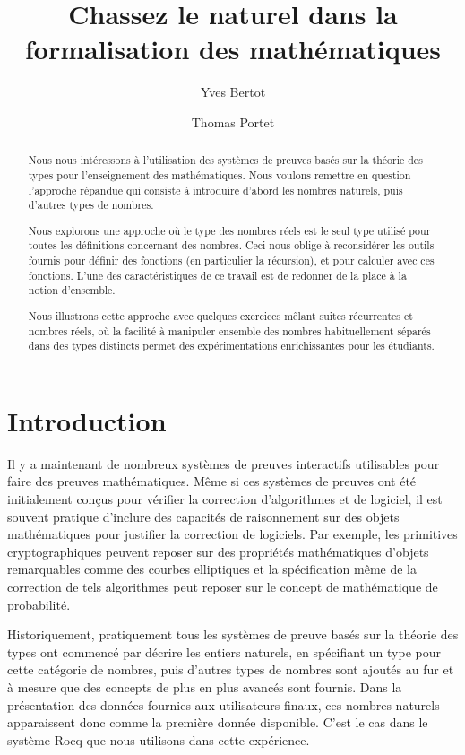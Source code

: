 \documentclass{modjflart}
\title{Chassez le naturel dans la formalisation des mathématiques}
\author[1]{Yves Bertot}
\author[1]{Thomas Portet}
\affil[1]{Centre Inria de l'Université Côte d'Azur, France}
\begin{document}
\maketitle

\begin{abstract}
  Nous nous intéressons à l'utilisation des systèmes de preuves basés sur la
  théorie des types pour l'enseignement des mathématiques.  Nous voulons
  remettre en question l'approche répandue qui consiste à introduire
  d'abord les nombres naturels, puis d'autres types de nombres.

  Nous explorons une approche où le type des nombres réels est le seul type
  utilisé pour toutes les définitions concernant des nombres.  Ceci nous oblige
  à reconsidérer les outils fournis pour définir des fonctions (en particulier
  la récursion), et pour calculer avec ces fonctions.
  L'une des caractéristiques de ce travail est de redonner de la place à
  la notion d'ensemble.

  Nous illustrons cette approche avec quelques exercices mêlant suites
  récurrentes et nombres réels, où la facilité à manipuler ensemble des nombres
  habituellement séparés dans des types distincts permet des expérimentations
  enrichissantes pour les étudiants.
\end{abstract}

\section{Introduction}

Il y a maintenant de nombreux systèmes de preuves interactifs
utilisables pour faire des preuves mathématiques.  Même si ces
systèmes de preuves ont été initialement conçus pour vérifier la
correction d'algorithmes et de logiciel, il est souvent pratique
d'inclure des capacités de raisonnement sur des objets mathématiques
pour justifier la correction de logiciels.  Par exemple, les
primitives cryptographiques peuvent reposer sur des propriétés
mathématiques d'objets remarquables comme des courbes elliptiques et
la spécification même de la correction de tels algorithmes peut
reposer sur le concept de mathématique de probabilité.

Historiquement, pratiquement tous les systèmes de preuve basés sur la
théorie des types ont commencé
par décrire les entiers naturels, en spécifiant un type pour cette
catégorie de nombres, puis d'autres types de nombres sont ajoutés au
fur et à mesure que des concepts de plus en plus avancés sont fournis.
Dans la présentation des données fournies aux utilisateurs finaux, ces
nombres naturels apparaissent donc comme la première donnée
disponible.  C'est le cas dans le système Rocq
\cite{the_coq_development_team_2024_11551307} que nous utilisons dans
cette expérience.
\end{document}
